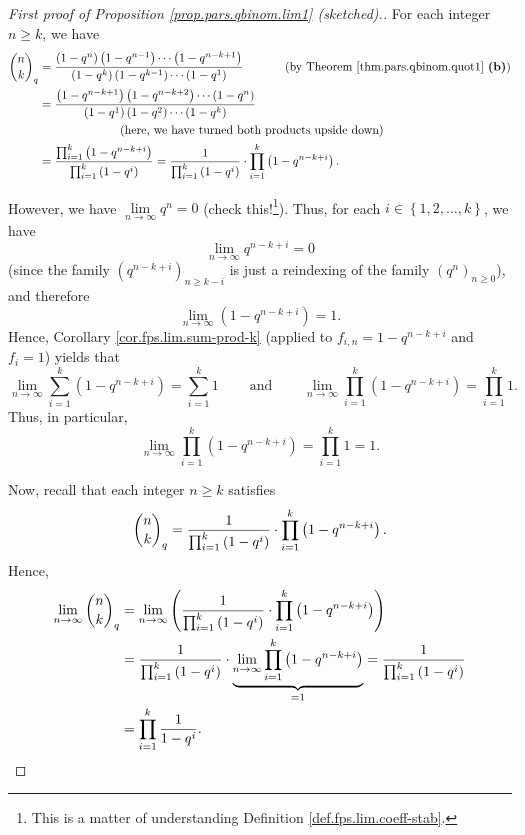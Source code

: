 \begin{proof}
[First proof of Proposition \ref{prop.pars.qbinom.lim1} (sketched).]For each
integer $n\geq k$, we have%
\begin{align*}
\dbinom{n}{k}_{q}  &  =\dfrac{\left(  1-q^{n}\right)  \left(  1-q^{n-1}%
\right)  \cdots\left(  1-q^{n-k+1}\right)  }{\left(  1-q^{k}\right)  \left(
1-q^{k-1}\right)  \cdots\left(  1-q^{1}\right)  }\ \ \ \ \ \ \ \ \ \ \left(
\text{by Theorem \ref{thm.pars.qbinom.quot1} \textbf{(b)}}\right) \\
&  =\dfrac{\left(  1-q^{n-k+1}\right)  \left(  1-q^{n-k+2}\right)
\cdots\left(  1-q^{n}\right)  }{\left(  1-q^{1}\right)  \left(  1-q^{2}%
\right)  \cdots\left(  1-q^{k}\right)  }\\
&  \ \ \ \ \ \ \ \ \ \ \ \ \ \ \ \ \ \ \ \ \left(  \text{here, we have turned
both products upside down}\right) \\
&  =\dfrac{\prod_{i=1}^{k}\left(  1-q^{n-k+i}\right)  }{\prod_{i=1}^{k}\left(
1-q^{i}\right)  }=\dfrac{1}{\prod_{i=1}^{k}\left(  1-q^{i}\right)  }\cdot
\prod_{i=1}^{k}\left(  1-q^{n-k+i}\right)  .
\end{align*}


However, we have $\lim\limits_{n\rightarrow\infty}q^{n}=0$ (check
this!\footnote{This is a matter of understanding Definition
\ref{def.fps.lim.coeff-stab}.}). Thus, for each $i\in\left\{  1,2,\ldots
,k\right\}  $, we have%
\[
\lim\limits_{n\rightarrow\infty}q^{n-k+i}=0
\]
(since the family $\left(  q^{n-k+i}\right)  _{n\geq k-i}$ is just a
reindexing of the family $\left(  q^{n}\right)  _{n\geq0}$), and therefore%
\[
\lim\limits_{n\rightarrow\infty}\left(  1-q^{n-k+i}\right)  =1.
\]
Hence, Corollary \ref{cor.fps.lim.sum-prod-k} (applied to $f_{i,n}%
=1-q^{n-k+i}$ and $f_{i}=1$) yields that%
\[
\lim\limits_{n\rightarrow\infty}\sum_{i=1}^{k}\left(  1-q^{n-k+i}\right)
=\sum_{i=1}^{k}1\ \ \ \ \ \ \ \ \ \ \text{and}\ \ \ \ \ \ \ \ \ \ \lim
\limits_{n\rightarrow\infty}\prod_{i=1}^{k}\left(  1-q^{n-k+i}\right)
=\prod_{i=1}^{k}1.
\]
Thus, in particular,%
\[
\lim\limits_{n\rightarrow\infty}\prod_{i=1}^{k}\left(  1-q^{n-k+i}\right)
=\prod_{i=1}^{k}1=1.
\]


Now, recall that each integer $n\geq k$ satisfies%
\[
\dbinom{n}{k}_{q}=\dfrac{1}{\prod_{i=1}^{k}\left(  1-q^{i}\right)  }\cdot
\prod_{i=1}^{k}\left(  1-q^{n-k+i}\right)  .
\]
Hence,%
\begin{align}
\lim\limits_{n\rightarrow\infty}\dbinom{n}{k}_{q}  &  =\lim
\limits_{n\rightarrow\infty}\left(  \dfrac{1}{\prod_{i=1}^{k}\left(
1-q^{i}\right)  }\cdot\prod_{i=1}^{k}\left(  1-q^{n-k+i}\right)  \right)
\nonumber\\
&  =\dfrac{1}{\prod_{i=1}^{k}\left(  1-q^{i}\right)  }\cdot\underbrace{\lim
\limits_{n\rightarrow\infty}\prod_{i=1}^{k}\left(  1-q^{n-k+i}\right)  }%
_{=1}=\dfrac{1}{\prod_{i=1}^{k}\left(  1-q^{i}\right)  }\nonumber\\
&  =\prod_{i=1}^{k}\dfrac{1}{1-q^{i}}. \label{pf.prop.pars.qbinom.lim1.rhs1}%
\end{align}



\end{proof}
